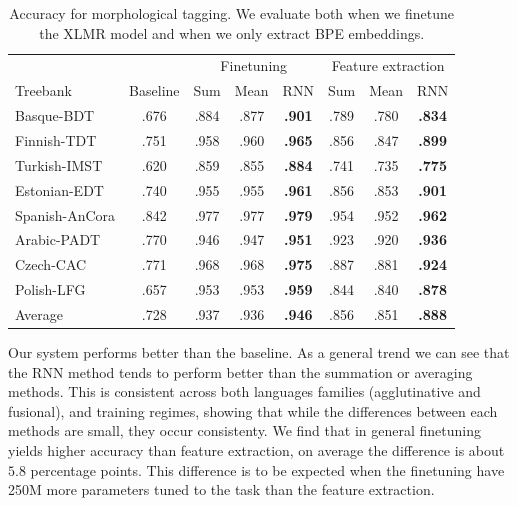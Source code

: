 \documentclass[11pt]{article}
\begin{document}
    \begin{table}%
	\centering
	\begin{tabular}{l|c|ccc|ccc}
		& & \multicolumn{3}{c}{Finetuning} & \multicolumn{3}{c}{Feature extraction} \\
		Treebank & Baseline & Sum & Mean & RNN & Sum & Mean & RNN \\
		\hline
		Basque-BDT      & .676 & .884 & .877 & \textbf{.901} & .789 & .780 & \textbf{.834} \\
		Finnish-TDT     & .751 & .958 & .960 & \textbf{.965} & .856 & .847 & \textbf{.899} \\
		Turkish-IMST    & .620 & .859 & .855 & \textbf{.884} & .741 & .735 & \textbf{.775} \\
		Estonian-EDT    & .740 & .955 & .955 & \textbf{.961} & .856 & .853 & \textbf{.901} \\
		Spanish-AnCora  & .842 & .977 & .977 & \textbf{.979} & .954 & .952 & \textbf{.962} \\
		Arabic-PADT     & .770 & .946 & .947 & \textbf{.951} & .923 & .920 & \textbf{.936} \\
		Czech-CAC       & .771 & .968 & .968 & \textbf{.975} & .887 & .881 & \textbf{.924} \\
		Polish-LFG      & .657 & .953 & .953 & \textbf{.959} & .844 & .840 & \textbf{.878} \\
        \hline
        Average         & .728 & .937 & .936 & \textbf{.946}  & .856 & .851 & \textbf{.888} \\
	\end{tabular}
    	\caption{\label{tab:results_tokens} Accuracy for morphological
        tagging. We evaluate both when we finetune the XLMR model and
        when we only extract BPE embeddings.}
    \end{table}


        Our system performs better than the baseline. As a general
        trend we can see that the RNN method tends to perform better
        than the summation or averaging methods. This is consistent
        across both languages families (agglutinative and fusional),
        and training regimes, showing that while the differences between each methods are
        small, they occur consistenty.
        We find that in general finetuning yields higher accuracy than
        feature extraction, on average the difference is about $5.8$
        percentage points.  This difference is to be expected when the
        finetuning have 250M more parameters tuned to the task than the
        feature extraction. %
    
\end{document}
